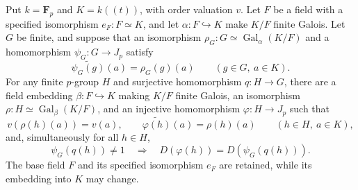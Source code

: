 \begin{theorem}
\label{thm:witt-depth-preserving-finite-quotient-lift}
\leanok
Put $k=\mathbf F_p$ and $K=k((t))$, with order valuation $v$.
Let $F$ be a field with a specified isomorphism $e_F:F\simeq K$,
and let $\alpha:F\hookrightarrow K$ make $K/F$ finite Galois.
Let $G$ be finite, and suppose that an isomorphism
$\rho_G:G\simeq\operatorname{Gal}_{\alpha}(K/F)$ and a homomorphism
$\psi_G:G\to J_p$ satisfy
\[
 \widetilde{\psi_G(g)}(a)=\rho_G(g)(a)
 \qquad(g\in G,\ a\in K).
\]
For any finite $p$-group $H$ and surjective homomorphism $q:H\to G$,
there are a field embedding $\beta:F\hookrightarrow K$ making
$K/F$ finite Galois, an isomorphism
$\rho:H\simeq\operatorname{Gal}_{\beta}(K/F)$, and an injective
homomorphism $\varphi:H\to J_p$ such that
\[
 v(\rho(h)(a))=v(a),\qquad
 \widetilde{\varphi(h)}(a)=\rho(h)(a)
 \qquad(h\in H,\ a\in K),
\]
and, simultaneously for all $h\in H$,
\[
 \psi_G(q(h))\ne1\quad\Longrightarrow\quad
 D(\varphi(h))=D(\psi_G(q(h))).
\]
The base field $F$ and its specified isomorphism $e_F$ are retained,
while its embedding into $K$ may change.
\end{theorem}


